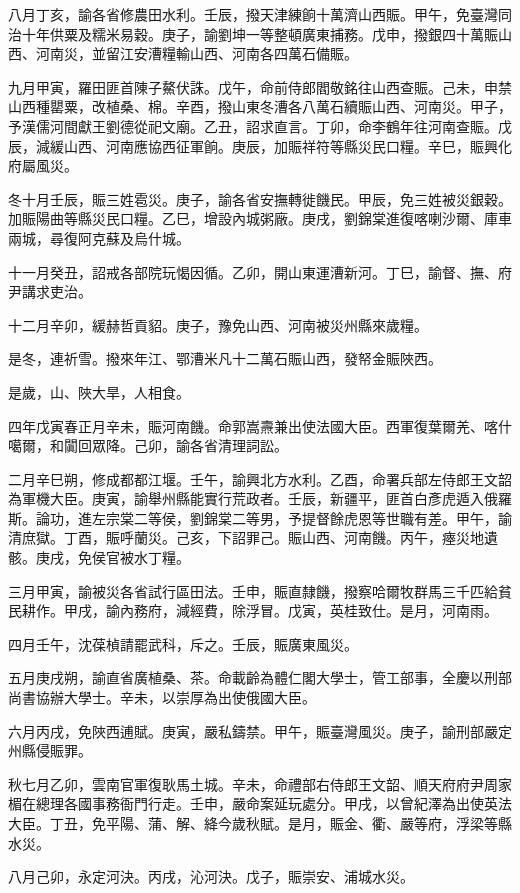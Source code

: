 \begin{pinyinscope}
八月丁亥，諭各省修農田水利。壬辰，撥天津練餉十萬濟山西賑。甲午，免臺灣同治十年供粟及糯米易穀。庚子，諭劉坤一等整頓廣東捕務。戊申，撥銀四十萬賑山西、河南災，並留江安漕糧輸山西、河南各四萬石備賑。

九月甲寅，羅田匪首陳子鰲伏誅。戊午，命前侍郎閻敬銘往山西查賑。己未，申禁山西種罌粟，改植桑、棉。辛酉，撥山東冬漕各八萬石續賑山西、河南災。甲子，予漢儒河間獻王劉德從祀文廟。乙丑，詔求直言。丁卯，命李鶴年往河南查賑。戊辰，減緩山西、河南應協西征軍餉。庚辰，加賑祥符等縣災民口糧。辛巳，賑興化府屬風災。

冬十月壬辰，賑三姓雹災。庚子，諭各省安撫轉徙饑民。甲辰，免三姓被災銀穀。加賑陽曲等縣災民口糧。乙巳，增設內城粥廠。庚戌，劉錦棠進復喀喇沙爾、庫車兩城，尋復阿克蘇及烏什城。

十一月癸丑，詔戒各部院玩愒因循。乙卯，開山東運漕新河。丁巳，諭督、撫、府尹講求吏治。

十二月辛卯，緩赫哲貢貂。庚子，豫免山西、河南被災州縣來歲糧。

是冬，連祈雪。撥來年江、鄂漕米凡十二萬石賑山西，發帑金賑陜西。

是歲，山、陜大旱，人相食。

四年戊寅春正月辛未，賑河南饑。命郭嵩燾兼出使法國大臣。西軍復葉爾羌、喀什噶爾，和闐回眾降。己卯，諭各省清理詞訟。

二月辛巳朔，修成都都江堰。壬午，諭興北方水利。乙酉，命署兵部左侍郎王文韶為軍機大臣。庚寅，諭舉州縣能實行荒政者。壬辰，新疆平，匪首白彥虎遁入俄羅斯。論功，進左宗棠二等侯，劉錦棠二等男，予提督餘虎恩等世職有差。甲午，諭清庶獄。丁酉，賑呼蘭災。己亥，下詔罪己。賑山西、河南饑。丙午，瘞災地遺骸。庚戌，免侯官被水丁糧。

三月甲寅，諭被災各省試行區田法。壬申，賑直隸饑，撥察哈爾牧群馬三千匹給貧民耕作。甲戌，諭內務府，減經費，除浮冒。戊寅，英桂致仕。是月，河南雨。

四月壬午，沈葆楨請罷武科，斥之。壬辰，賑廣東風災。

五月庚戌朔，諭直省廣植桑、茶。命載齡為體仁閣大學士，管工部事，全慶以刑部尚書協辦大學士。辛未，以崇厚為出使俄國大臣。

六月丙戌，免陜西逋賦。庚寅，嚴私鑄禁。甲午，賑臺灣風災。庚子，諭刑部嚴定州縣侵賑罪。

秋七月乙卯，雲南官軍復耿馬土城。辛未，命禮部右侍郎王文韶、順天府府尹周家楣在總理各國事務衙門行走。壬申，嚴命案延玩處分。甲戌，以曾紀澤為出使英法大臣。丁丑，免平陽、蒲、解、絳今歲秋賦。是月，賑金、衢、嚴等府，浮梁等縣水災。

八月己卯，永定河決。丙戌，沁河決。戊子，賑崇安、浦城水災。


\end{pinyinscope}
